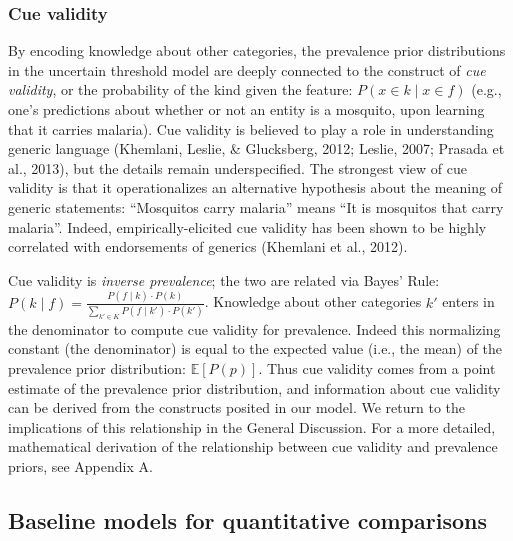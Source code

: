 \documentclass[english,,man,floatsintext]{apa6}
\theoremstyle{definition}
\theoremstyle{definition}
\theoremstyle{definition}
\theoremstyle{remark}
\begin{document}
\hypertarget{cue-validity}{%
\subsubsection{Cue validity}\label{cue-validity}}

By encoding knowledge about other categories, the prevalence prior
distributions in the uncertain threshold model are deeply connected to
the construct of \emph{cue validity}, or the probability of the kind
given the feature: \(P(x \in k \mid x \in f)\) (e.g., one's predictions
about whether or not an entity is a mosquito, upon learning that it
carries malaria). Cue validity is believed to play a role in
understanding generic language (Khemlani, Leslie, \& Glucksberg, 2012;
Leslie, 2007; Prasada et al., 2013), but the details remain
underspecified. The strongest view of cue validity is that it
operationalizes an alternative hypothesis about the meaning of generic
statements: \enquote{Mosquitos carry malaria} means \enquote{It is
mosquitos that carry malaria}. Indeed, empirically-elicited cue validity
has been shown to be highly correlated with endorsements of generics
(Khemlani et al., 2012).

Cue validity is \emph{inverse prevalence}; the two are related via
Bayes' Rule:
\(P( k \mid f) = \frac{P( f \mid k) \cdot P( k)}{\sum\limits_{k' \in K} P( f \mid k') \cdot P( k')}\).
Knowledge about other categories \(k'\) enters in the denominator to
compute cue validity for prevalence. Indeed this normalizing constant
(the denominator) is equal to the expected value (i.e., the mean) of the
prevalence prior distribution: \(\mathbb{E}[P(p)]\). Thus cue validity
comes from a point estimate of the prevalence prior distribution, and
information about cue validity can be derived from the constructs
posited in our model. We return to the implications of this relationship
in the General Discussion. For a more detailed, mathematical derivation
of the relationship between cue validity and prevalence priors, see
Appendix A.

\hypertarget{baseline-models-for-quantitative-comparisons}{%
\subsection{Baseline models for quantitative
comparisons}\label{baseline-models-for-quantitative-comparisons}}
\end{document}
